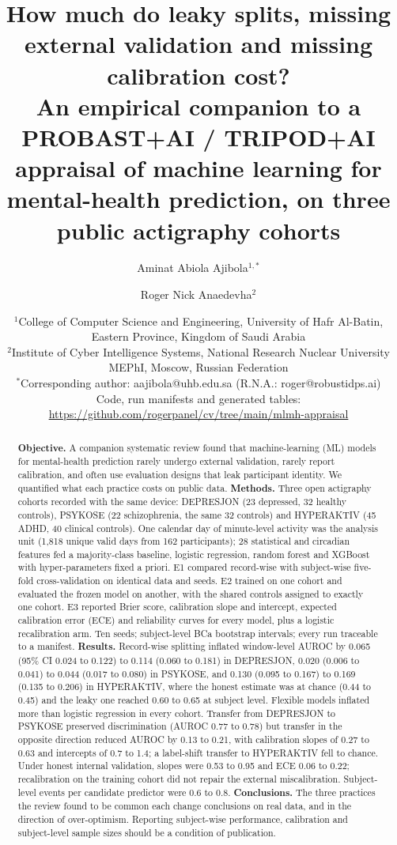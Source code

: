 \documentclass[11pt,a4paper]{article}
\title{How much do leaky splits, missing external validation and missing calibration cost?\\
An empirical companion to a PROBAST+AI / TRIPOD+AI appraisal of machine learning for mental-health prediction, on three public actigraphy cohorts}
\author{Aminat Abiola Ajibola$^{1,*}$ \and Roger Nick Anaedevha$^{2}$}
\date{\footnotesize $^{1}$College of Computer Science and Engineering, University of Hafr Al-Batin, Eastern Province, Kingdom of Saudi Arabia \\
$^{2}$Institute of Cyber Intelligence Systems, National Research Nuclear University MEPhI, Moscow, Russian Federation \\[0.3em]
$^{*}$Corresponding author: aajibola@uhb.edu.sa \quad (R.N.A.: roger@robustidps.ai) \\[0.4em]
Code, run manifests and generated tables: \url{https://github.com/rogerpanel/cv/tree/main/mlmh-appraisal}}
\begin{document}
\maketitle
\linenumbers

\begin{abstract}
\textbf{Objective.} A companion systematic review found that machine-learning (ML) models for
mental-health prediction rarely undergo external validation, rarely report calibration, and often
use evaluation designs that leak participant identity. We quantified what each practice costs on
public data. \textbf{Methods.} Three open actigraphy cohorts recorded with the same device:
DEPRESJON (23 depressed, 32 healthy controls), PSYKOSE (22 schizophrenia, the same 32 controls)
and HYPERAKTIV (45 ADHD, 40 clinical controls). One calendar day of minute-level activity was the
analysis unit (1{,}818 unique valid days from 162 participants); 28 statistical and circadian
features fed a majority-class baseline, logistic regression, random forest and XGBoost with
hyper-parameters fixed a priori. E1 compared record-wise with subject-wise five-fold
cross-validation on identical data and seeds. E2 trained on one cohort and evaluated the frozen
model on another, with the shared controls assigned to exactly one cohort. E3 reported Brier score,
calibration slope and intercept, expected calibration error (ECE) and reliability curves for every
model, plus a logistic recalibration arm. Ten seeds; subject-level BCa bootstrap intervals; every
run traceable to a manifest. \textbf{Results.} Record-wise splitting inflated window-level AUROC
by 0.065 (95\% CI 0.024 to 0.122) to 0.114 (0.060 to 0.181) in DEPRESJON, 0.020 (0.006 to 0.041)
to 0.044 (0.017 to 0.080) in PSYKOSE, and 0.130 (0.095 to 0.167) to 0.169 (0.135 to 0.206) in
HYPERAKTIV, where the honest estimate was at chance (0.44 to 0.45) and the leaky one reached 0.60
to 0.65 at subject level. Flexible models inflated more than logistic regression in every cohort.
Transfer from DEPRESJON to PSYKOSE preserved discrimination (AUROC 0.77 to 0.78) but transfer in
the opposite direction reduced AUROC by 0.13 to 0.21, with calibration slopes of 0.27 to 0.63 and
intercepts of 0.7 to 1.4; a label-shift transfer to HYPERAKTIV fell to chance. Under honest
internal validation, slopes were 0.53 to 0.95 and ECE 0.06 to 0.22; recalibration on the training
cohort did not repair the external miscalibration. Subject-level events per candidate predictor
were 0.6 to 0.8. \textbf{Conclusions.} The three practices the review found to be common each
change conclusions on real data, and in the direction of over-optimism. Reporting subject-wise
performance, calibration and subject-level sample sizes should be a condition of publication.
\end{abstract}
\end{document}
